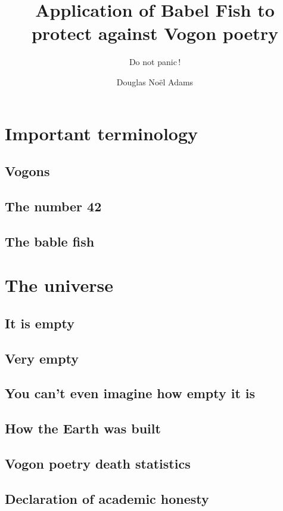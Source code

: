 \documentclass[oneside, print, hidelinks]{JenThesis}
\author{Douglas Noël Adams}
\title{Application of Babel Fish to protect against Vogon poetry}
\subtitle{Do not panic\,!}
\begin{document}
	
	\frontmatter
		\autofrontmatter
	\mainmatter
			\lipsum[16-17]
		\chapter{Important terminology}
			\lipsum[1-2]
			\section{Vogons}
				\lipsum[3-4]
			\section{The number 42}
				\lipsum[5-6]
			\section{The bable fish}
				\lipsum[7-8]
		\chapter{The universe}
			\lipsum[9]
			\section{It is empty}
				\lipsum[10-11]
			\section{Very empty}
				\lipsum[12-13]
			\section{You can't even imagine how empty it is}
				\lipsum[14-15]
	\appendix
			\section{How the Earth was built}
				\lipsum[18]
			\section{Vogon poetry death statistics}
				\lipsum[19]
	\backmatter
		\section{Declaration of academic honesty}
			\lipsum[20]
		
\end{document}
